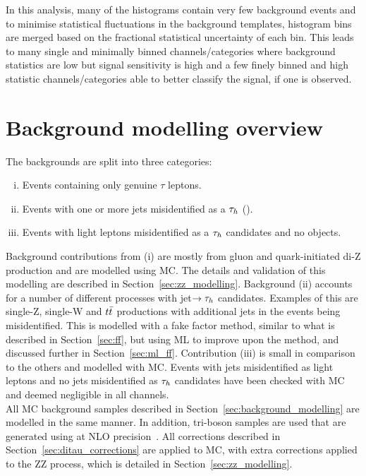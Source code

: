 In this analysis, many of the histograms contain very few background events and to minimise statistical fluctuations in the background templates, histogram bins are merged based on the fractional statistical uncertainty of each bin.
This leads to many single and minimally binned channels/categories where background statistics are low but signal sensitivity is high and a few finely binned and high statistic channels/categories able to better classify the signal, if one is observed.
 
\section{Background modelling overview}

The backgrounds are split into three categories:
\begin{enumerate}[i)]
  \item Events containing only genuine $\tau$ leptons.
  \item Events with one or more jets misidentified as a $\tau_{h}$ (\jtth).
  \item Events with light leptons misidentified as a $\tau_{h}$ candidates and no \jtth objects. 
\end{enumerate}

Background contributions from (i) are mostly from gluon and quark-initiated di-Z production and are modelled using \ac{MC}.
The details and validation of this modelling are described in Section~\ref{sec:zz_modelling}.
Background (ii) accounts for a number of different processes with jet$\rightarrow \tau_{h}$ candidates.
Examples of this are single-Z, single-W and $t\bar{t}$ productions with additional jets in the events being misidentified.
This is modelled with a fake factor method, similar to what is described in Section~\ref{sec:ff}, but using \ac{ML} to improve upon the method, and discussed further in Section~\ref{sec:ml_ff}.
Contribution (iii) is small in comparison to the others and modelled with \ac{MC}.
Events with jets misidentified as light leptons and no jets misidentified as $\tau_{h}$ candidates have been checked with \ac{MC} and deemed negligible in all channels. \\

All \ac{MC} background samples described in Section~\ref{sec:background_modelling} are modelled in the same manner.  
In addition, tri-boson samples are used that are generated using \MGvATNLO at \ac{NLO} precision~\cite{Alwall:2011uj}.
All corrections described in Section~\ref{sec:ditau_corrections} are applied to \ac{MC}, with extra corrections applied to the ZZ process, which is detailed in Section~\ref{sec:zz_modelling}.

